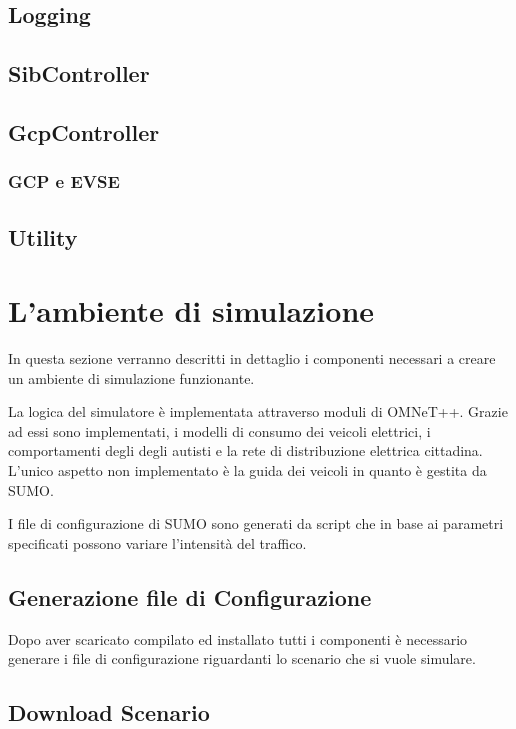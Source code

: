 \subsection{Logging}

\subsection{SibController}

\subsection{GcpController}

\subsubsection{GCP e EVSE}

\subsection{Utility}

\section{L'ambiente di simulazione}

In questa sezione verranno descritti in dettaglio i componenti necessari a creare un ambiente di simulazione funzionante.

La logica del simulatore è implementata attraverso moduli di OMNeT++. Grazie ad essi sono implementati, i modelli di consumo dei veicoli elettrici, i comportamenti degli degli autisti e la rete di distribuzione elettrica cittadina. L'unico aspetto non implementato è la guida dei veicoli in quanto è gestita da SUMO.

I file di configurazione di SUMO sono generati da script che in base ai parametri specificati possono variare l'intensità del traffico.


\subsection{Generazione file di Configurazione}

Dopo aver scaricato compilato ed installato tutti i componenti è necessario generare i file di configurazione riguardanti lo scenario che si vuole simulare. 

\subsection{Download Scenario}

